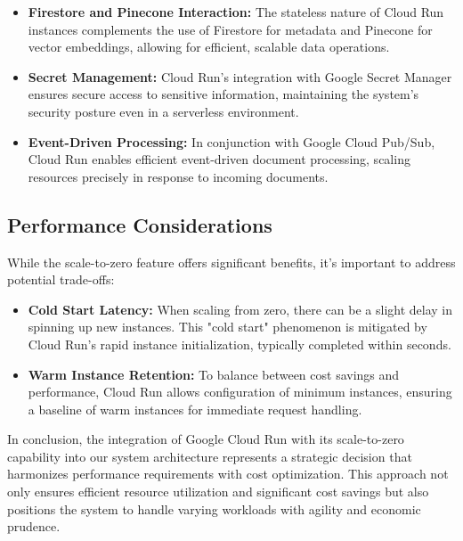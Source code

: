 \documentclass[a4paper, 12pt]{report}
\begin{document}
\begin{itemize}
    \item \textbf{Firestore and Pinecone Interaction:} The stateless nature of Cloud Run instances complements the use of Firestore for metadata and Pinecone for vector embeddings, allowing for efficient, scalable data operations.
    \item \textbf{Secret Management:} Cloud Run's integration with Google Secret Manager ensures secure access to sensitive information, maintaining the system's security posture even in a serverless environment.
    \item \textbf{Event-Driven Processing:} In conjunction with Google Cloud Pub/Sub, Cloud Run enables efficient event-driven document processing, scaling resources precisely in response to incoming documents.
\end{itemize}

\subsection{Performance Considerations}
While the scale-to-zero feature offers significant benefits, it's important to address potential trade-offs:

\begin{itemize}
    \item \textbf{Cold Start Latency:} When scaling from zero, there can be a slight delay in spinning up new instances. This "cold start" phenomenon is mitigated by Cloud Run's rapid instance initialization, typically completed within seconds.
    \item \textbf{Warm Instance Retention:} To balance between cost savings and performance, Cloud Run allows configuration of minimum instances, ensuring a baseline of warm instances for immediate request handling.
\end{itemize}

In conclusion, the integration of Google Cloud Run with its scale-to-zero capability into our system architecture represents a strategic decision that harmonizes performance requirements with cost optimization. This approach not only ensures efficient resource utilization and significant cost savings but also positions the system to handle varying workloads with agility and economic prudence.
\end{document}
